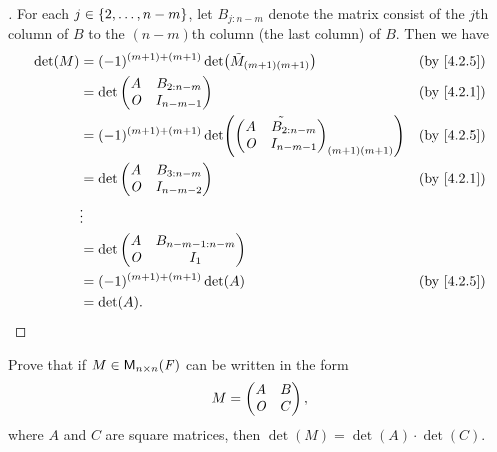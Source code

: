 \begin{proof}[]
	For each \(j \in \left\lbrace2, \dots, n - m\right\rbrace\), let \(B_{j : n - m}\) denote the matrix consist of the \(j\)th column of \(B\) to the \((n - m)\)th column (the last column) of \(B\).
	Then we have
	\begin{align*}
		\det(M) & = (-1)^{(m + 1) + (m + 1)} \det\pa{\tilde{M}_{(m + 1) (m + 1)}} &  & \by{4.2.5}                   \\
		        & = \det\begin{pmatrix}
			                A   & B_{2 : n - m} \\
			                \zm & I_{n - m - 1}
		                \end{pmatrix}                                          &  & \by{4.2.1}                      \\
		        & = (-1)^{(m + 1) + (m + 1)} \det\pa{\tilde{\begin{pmatrix}
					                                                    A   & B_{2 : n - m} \\
					                                                    \zm & I_{n - m - 1}
				                                                    \end{pmatrix}}_{(m + 1) (m + 1)}}       &  & \by{4.2.5} \\
		        & = \det\begin{pmatrix}
			                A   & B_{3 : n - m} \\
			                \zm & I_{n - m - 2}
		                \end{pmatrix}                                          &  & \by{4.2.1}                      \\
		        & \vdots                                                                                            \\
		        & = \det\begin{pmatrix}
			                A   & B_{n - m - 1 : n - m} \\
			                \zm & I_1
		                \end{pmatrix}                                                                 \\
		        & = (-1)^{(m + 1) + (m + 1)} \det(A)                              &  & \by{4.2.5}                   \\
		        & = \det(A).
	\end{align*}
\end{proof}

\begin{ex}\label{ex:4.3.21}
	Prove that if \(M \in \mathsf{M}_{{n} \times n}({\mathit{F}})\) can be written in the form
	\[
		M = \begin{pmatrix}
			A   & B \\
			\mathit{O} & C
		\end{pmatrix},
	\]
	where \(A\) and \(C\) are square matrices, then \(\det(M) = \det(A) \cdot \det(C)\).
\end{ex}

